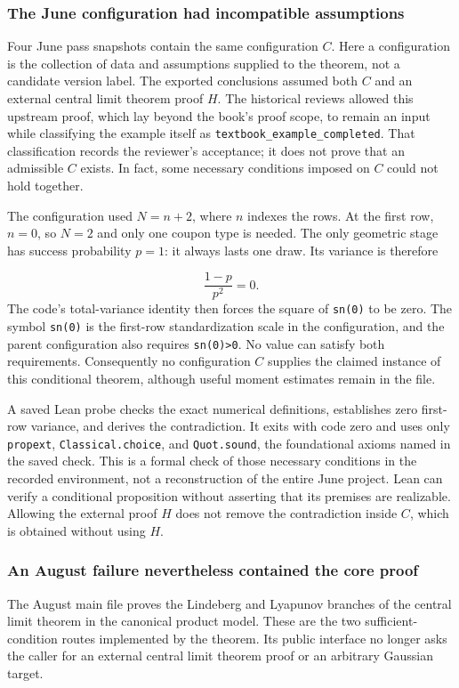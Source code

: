 \subsubsection[The June configuration had incompatible assumptions]{\texorpdfstring{\protect\hypertarget{l3-3}{}The June configuration had incompatible assumptions}{The June configuration had incompatible assumptions}}
Four June pass snapshots contain the same configuration $C$. Here a configuration is the collection of data and assumptions supplied to the theorem, not a candidate version label. The exported conclusions assumed both $C$ and an external central limit theorem proof $H$. The historical reviews allowed this upstream proof, which lay beyond the book's proof scope, to remain an input while classifying the example itself as \nolinkurl{textbook_example_completed}. That classification records the reviewer's acceptance; it does not prove that an admissible $C$ exists. In fact, some necessary conditions imposed on $C$ could not hold together.

The configuration used $N=n+2$, where $n$ indexes the rows. At the first row, $n=0$, so $N=2$ and only one coupon type is needed. The only geometric stage has success probability $p=1$: it always lasts one draw. Its variance is therefore

\[
\frac{1-p}{p^2}=0.
\]
The code's total-variance identity then forces the square of \nolinkurl{sn(0)} to be zero. The symbol \nolinkurl{sn(0)} is the first-row standardization scale in the configuration, and the parent configuration also requires \nolinkurl{sn(0)>0}. No value can satisfy both requirements. Consequently no configuration $C$ supplies the claimed instance of this conditional theorem, although useful moment estimates remain in the file.

A saved Lean probe checks the exact numerical definitions, establishes zero first-row variance, and derives the contradiction. It exits with code zero and uses only \nolinkurl{propext}, \nolinkurl{Classical.choice}, and \nolinkurl{Quot.sound}, the foundational axioms named in the saved check. This is a formal check of those necessary conditions in the recorded environment, not a reconstruction of the entire June project. Lean can verify a conditional proposition without asserting that its premises are realizable. Allowing the external proof $H$ does not remove the contradiction inside $C$, which is obtained without using $H$.

\subsubsection[An August failure nevertheless contained the core proof]{\texorpdfstring{\protect\hypertarget{l3-4}{}An August failure nevertheless contained the core proof}{An August failure nevertheless contained the core proof}}
The August main file proves the Lindeberg and Lyapunov branches of the central limit theorem in the canonical product model. These are the two sufficient-condition routes implemented by the theorem. Its public interface no longer asks the caller for an external central limit theorem proof or an arbitrary Gaussian target.

